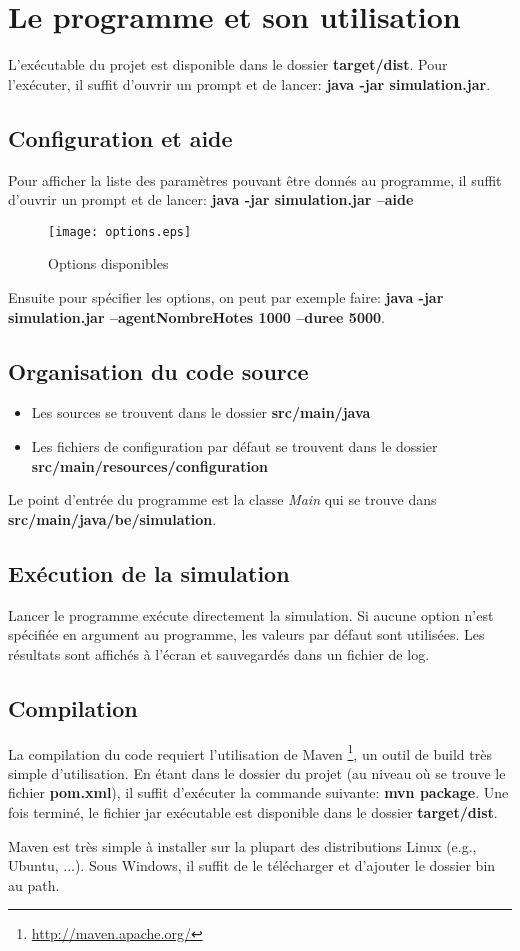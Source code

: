 \appendix

\section{Le programme et son utilisation}
L'exécutable du projet est disponible dans le dossier \textbf{target/dist}. Pour l'exécuter, il suffit d'ouvrir un prompt et de lancer: \textbf{java -jar simulation.jar}.

\subsection{Configuration et aide}
Pour afficher la liste des paramètres pouvant être donnés au programme, il suffit d'ouvrir un prompt et de lancer: \textbf{java -jar simulation.jar --aide}


\begin{figure}[h!t]
  \centering
    \texttt{[image: options.eps]}
  \caption{Options disponibles}
  \label{fig:options}
\end{figure}

Ensuite pour spécifier les options, on peut par exemple faire: \textbf{java -jar simulation.jar --agentNombreHotes 1000 --duree 5000}.

\subsection{Organisation du code source}
\begin{itemize}
 \item Les sources se trouvent dans le dossier \textbf{src/main/java}
 \item Les fichiers de configuration par défaut se trouvent dans le dossier \textbf{src/main/resources/configuration}
\end{itemize}

Le point d'entrée du programme est la classe \textit{Main} qui se trouve dans \textbf{src/main/java/be/simulation}.

\subsection{Exécution de la simulation}
Lancer le programme exécute directement la simulation. Si aucune option n'est spécifiée en argument au programme, les valeurs par défaut sont utilisées. Les résultats sont affichés à l'écran et sauvegardés dans un fichier de log.

\subsection{Compilation}
La compilation du code requiert l'utilisation de Maven \footnote{\url{http://maven.apache.org/}}, un outil de build très simple d'utilisation. En étant dans le dossier du projet (au niveau où se trouve le fichier \textbf{pom.xml}), il suffit d'exécuter la commande suivante: \textbf{mvn package}. Une fois terminé, le fichier jar exécutable est disponible dans le dossier \textbf{target/dist}.

Maven est très simple à installer sur la plupart des distributions Linux (e.g., Ubuntu, ...). Sous Windows, il suffit de le télécharger et d'ajouter le dossier bin au path.